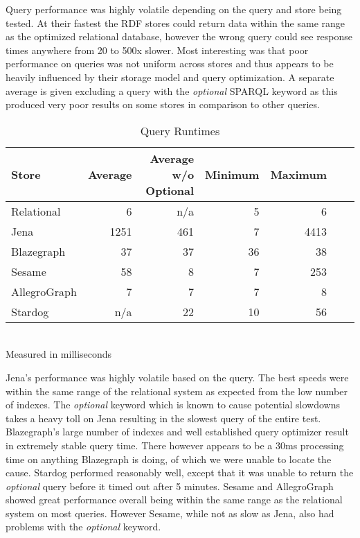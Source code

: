 \documentclass{llncs}
\begin{document}
Query performance was highly volatile depending on the query and store being tested.
At their fastest the RDF stores could return data within the same range as the optimized relational database, however the wrong query could see response times anywhere from 20 to 500x slower.
Most interesting was that poor performance on queries was not uniform across stores and thus appears to be heavily influenced by their storage model and query optimization.
A separate average is given excluding a query with the \emph{optional} SPARQL keyword as this produced very poor results on some stores in comparison to other queries.

\vspace{-1.5em}
\begin{table}
\begin{center}
\caption{Query Runtimes}
\begin{tabular}{l | r | r | r | r | r | r}
    Store & Average & Average w/o Optional & Minimum & Maximum \\
\hline
Relational & 6 & n/a & 5 & 6 \\
Jena & 1251 & 461 & 7 & 4413  \\
Blazegraph & 37 & 37 & 36 & 38 \\
Sesame & 58 & 8 & 7 & 253  \\
AllegroGraph & 7 & 7 & 7 & 8 \\
Stardog & n/a & 22 & 10 & 56 \\
\end{tabular}
\\[5pt]
Measured in milliseconds
\end{center}
\end{table}
\vspace{-2em}

Jena's performance was highly volatile based on the query.
The best speeds were within the same range of the relational system as expected from the low number of indexes.
The \emph{optional} keyword which is known to cause potential slowdowns takes a heavy toll on Jena resulting in the slowest query of the entire test.
Blazegraph's large number of indexes and well established query optimizer result in extremely stable query time.
There however appears to be a 30ms processing time on anything Blazegraph is doing, of which we were unable to locate the cause.
Stardog performed reasonably well, except that it was unable to return the \emph{optional} query before it timed out after 5 minutes.
Sesame and AllegroGraph showed great performance overall being within the same range as the relational system on most queries. 
However Sesame, while not as slow as Jena, also had problems with the \emph{optional} keyword.
\end{document}
